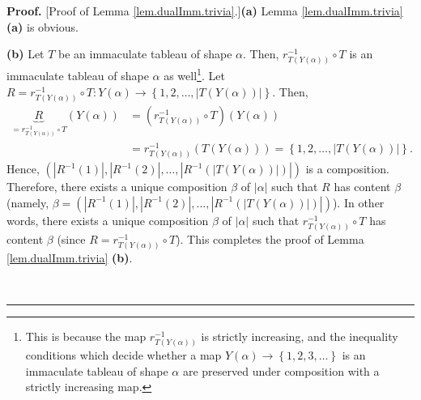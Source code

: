 \documentclass
[numbers=enddot,12pt,final,onecolumn,notitlepage,abstracton]{scrartcl}%
\theoremstyle{definition}
\newenvironment{proof}[1][Proof]{\noindent\textbf{#1.} }{\ \rule{0.5em}{0.5em}}
\begin{document}
\begin{proof}
[Proof of Lemma \ref{lem.dualImm.trivia}.]\textbf{(a)} Lemma
\ref{lem.dualImm.trivia} \textbf{(a)} is obvious.

\textbf{(b)} Let $T$ be an immaculate tableau of shape $\alpha$. Then,
$r_{T\left(  Y\left(  \alpha\right)  \right)  }^{-1}\circ T$ is an immaculate
tableau of shape $\alpha$ as well\footnote{This is because the map
$r_{T\left(  Y\left(  \alpha\right)  \right)  }^{-1}$ is strictly increasing,
and the inequality conditions which decide whether a map $Y\left(
\alpha\right)  \rightarrow\left\{  1,2,3,\ldots\right\}  $ is an immaculate
tableau of shape $\alpha$ are preserved under composition with a strictly
increasing map.}. Let $R=r_{T\left(  Y\left(  \alpha\right)  \right)  }%
^{-1}\circ T:Y\left(  \alpha\right)  \rightarrow\left\{  1,2,\ldots,\left\vert
T\left(  Y\left(  \alpha\right)  \right)  \right\vert \right\}  $. Then,%
\begin{align*}
\underbrace{R}_{=r_{T\left(  Y\left(  \alpha\right)  \right)  }^{-1}\circ
T}\left(  Y\left(  \alpha\right)  \right)   &  =\left(  r_{T\left(  Y\left(
\alpha\right)  \right)  }^{-1}\circ T\right)  \left(  Y\left(  \alpha\right)
\right) \\
&  =r_{T\left(  Y\left(  \alpha\right)  \right)  }^{-1}\left(  T\left(
Y\left(  \alpha\right)  \right)  \right)  =\left\{  1,2,\ldots,\left\vert
T\left(  Y\left(  \alpha\right)  \right)  \right\vert \right\}  .
\end{align*}
Hence, $\left(  \left\vert R^{-1}\left(  1\right)  \right\vert ,\left\vert
R^{-1}\left(  2\right)  \right\vert ,\ldots,\left\vert R^{-1}\left(
\left\vert T\left(  Y\left(  \alpha\right)  \right)  \right\vert \right)
\right\vert \right)  $ is a composition. Therefore, there exists a unique
composition $\beta$ of $\left\vert \alpha\right\vert $ such that $R$ has
content $\beta$ (namely, $\beta=\left(  \left\vert R^{-1}\left(  1\right)
\right\vert ,\left\vert R^{-1}\left(  2\right)  \right\vert ,\ldots,\left\vert
R^{-1}\left(  \left\vert T\left(  Y\left(  \alpha\right)  \right)  \right\vert
\right)  \right\vert \right)  $). In other words, there exists a unique
composition $\beta$ of $\left\vert \alpha\right\vert $ such that $r_{T\left(
Y\left(  \alpha\right)  \right)  }^{-1}\circ T$ has content $\beta$ (since
$R=r_{T\left(  Y\left(  \alpha\right)  \right)  }^{-1}\circ T$). This
completes the proof of Lemma \ref{lem.dualImm.trivia} \textbf{(b)}.


\end{proof}
\end{document}
